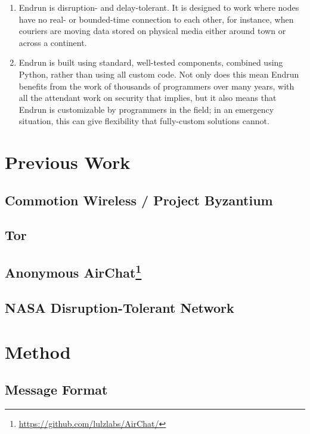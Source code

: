 \documentclass[12pt]{article}
\begin{document}
\begin{enumerate}
    \item Endrun is disruption- and delay-tolerant. It is designed to work where nodes have no real- or bounded-time connection to each other, for instance, when couriers are moving data stored on physical media either around town or across a continent.
    
    \item Endrun is built using standard, well-tested components, combined using Python, rather than using all custom code. Not only does this mean Endrun benefits from the work of thousands of programmers over many years, with all the attendant work on security that implies, but it also means that Endrun is customizable by programmers in the field; in an emergency situation, this can give flexibility that fully-custom solutions cannot.
    
  \end{enumerate}
  
  \section{Previous Work}
  
  \subsection{Commotion Wireless / Project Byzantium}
  
  \subsection{Tor}
  
  \subsection{Anonymous AirChat\footnote{\url{https://github.com/lulzlabs/AirChat/}}}
  
  \subsection{NASA Disruption-Tolerant Network}
  
  \section{Method}
  
  \subsection{Message Format}
  
\end{document}
